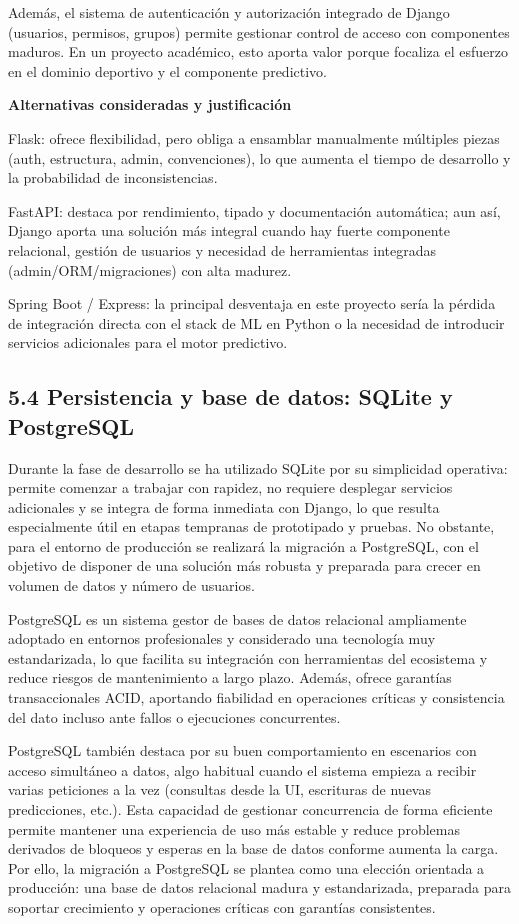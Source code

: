 Además, el sistema de autenticación y autorización integrado de Django (usuarios, permisos, grupos) 
permite gestionar control de acceso con componentes maduros. En un proyecto académico, esto aporta 
valor porque focaliza el esfuerzo en el dominio deportivo y el componente predictivo.

\textbf{Alternativas consideradas y justificación}

Flask: ofrece flexibilidad, pero obliga a ensamblar manualmente múltiples piezas (auth, estructura, 
admin, convenciones), lo que aumenta el tiempo de desarrollo y la probabilidad de inconsistencias.

FastAPI: destaca por rendimiento, tipado y documentación automática; aun así, Django aporta una 
solución más integral cuando hay fuerte componente relacional, gestión de usuarios y necesidad de 
herramientas integradas (admin/ORM/migraciones) con alta madurez.

Spring Boot / Express: la principal desventaja en este proyecto sería la pérdida de integración 
directa con el stack de ML en Python o la necesidad de introducir servicios adicionales para el 
motor predictivo.

\subsection{5.4 Persistencia y base de datos: SQLite y PostgreSQL}

Durante la fase de desarrollo se ha utilizado SQLite por su simplicidad operativa: permite comenzar 
a trabajar con rapidez, no requiere desplegar servicios adicionales y se integra de forma inmediata 
con Django, lo que resulta especialmente útil en etapas tempranas de prototipado y pruebas. No 
obstante, para el entorno de producción se realizará la migración a PostgreSQL, con el objetivo de 
disponer de una solución más robusta y preparada para crecer en volumen de datos y número de 
usuarios.

PostgreSQL es un sistema gestor de bases de datos relacional ampliamente adoptado en entornos 
profesionales y considerado una tecnología muy estandarizada, lo que facilita su integración con 
herramientas del ecosistema y reduce riesgos de mantenimiento a largo plazo. Además, ofrece garantías 
transaccionales ACID, aportando fiabilidad en operaciones críticas y consistencia del dato incluso 
ante fallos o ejecuciones concurrentes.

PostgreSQL también destaca por su buen comportamiento en escenarios con acceso simultáneo a datos, 
algo habitual cuando el sistema empieza a recibir varias peticiones a la vez (consultas desde la UI, 
escrituras de nuevas predicciones, etc.). Esta capacidad de gestionar concurrencia de forma eficiente 
permite mantener una experiencia de uso más estable y reduce problemas derivados de bloqueos y esperas 
en la base de datos conforme aumenta la carga. Por ello, la migración a PostgreSQL se plantea como 
una elección orientada a producción: una base de datos relacional madura y estandarizada, preparada 
para soportar crecimiento y operaciones críticas con garantías consistentes.

